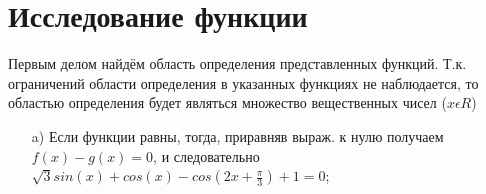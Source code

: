 \documentclass[russian,utf8,nocolumnxxxi,nocolumnxxxii]{eskdtext}
\begin{document}
\newpage
\section{Исследование функции}
Первым делом найдём область определения представленных функций. Т.к. ограничений области определения в указанных функциях не наблюдается, то областью определения будет являться множество вещественных чисел ($x \epsilon R$)
\begin{enumerate}
    \item[a)] Если функции равны, тогда, приравняв выраж. к нулю получаем 
    $f(x)-g(x)=0$, и следовательно  $\sqrt{3}sin(x)+cos(x)-cos(2x+\frac{\pi}{3})+1 = 0$;
    
    

\end{enumerate}
\end{document}
